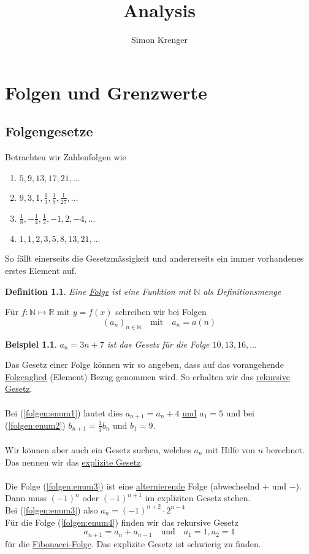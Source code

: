 \documentclass{report}
\title{Analysis}
\author{Simon Krenger}
\newtheorem{mydef}{Definition}
\newtheorem{myexample}{Beispiel}
\begin{document}
\maketitle
\chapter{Folgen und Grenzwerte}
\section{Folgengesetze}
Betrachten wir Zahlenfolgen wie
\begin{enumerate}
\item $5, 9, 13, 17, 21, ...$ \label{folgen:enum1}
\item $9, 3, 1, \frac{1}{3}, \frac{1}{9}, \frac{1}{27}, ...$ \label{folgen:enum2}
\item $\frac{1}{8}, -\frac{1}{4}, \frac{1}{2}, -1, 2, -4, ... $ \label{folgen:enum3}
\item $1, 1, 2, 3, 5, 8, 13, 21, ...$ \label{folgen:enum4}
\end{enumerate}
So fällt einerseits die Gesetzmässigkeit und andererseits ein immer vorhandenes erstes Element auf.
\begin{mydef}Eine \underline{Folge} ist eine Funktion mit $\mathbb{N}$ als Definitionsmenge\end{mydef}
Für $f: \mathbb{N} \mapsto \mathbb{R}$ mit $y = f(x)$ schreiben wir bei Folgen
\begin{equation}(a_n)_{n \in \mathbb{N}} \quad \mbox{mit} \quad a_n=a(n)\end{equation}
\begin{myexample}$a_n = 3n + 7$ ist das Gesetz für die Folge $10, 13, 16, ...$\end{myexample}
Das Gesetz einer Folge können wir so angeben, dass auf das vorangehende \underline{Folgenglied} (Element) Bezug genommen wird. So erhalten wir das \underline{rekursive Gesetz}.
\\\\
Bei (\ref{folgen:enum1}) lautet dies $a_{n+1} = a_n + 4$ \underline{und} $a_1 = 5$ und bei (\ref{folgen:enum2}) $b_{n+1}=\frac{1}{3}b_n$ und $b_1=9$.
\\\\
Wir können aber auch ein Gesetz suchen, welches $a_n$ mit Hilfe von $n$ berechnet. Das nennen wir das \underline{explizite Gesetz}.
\\\\
Die Folge (\ref{folgen:enum3}) ist eine \underline{alternierende} Folge (abwechselnd $+$ und $-$). Dann muss $(-1)^n$ oder $(-1)^{n+1}$ im expliziten Gesetz stehen.\\
Bei (\ref{folgen:enum3}) also $a_n = (-1)^{n+2} \cdot 2^{n-4}$\\
Für die Folge  (\ref{folgen:enum4}) finden wir das rekursive Gesetz
\begin{equation}a_{n+1} = a_n + a_{n-1} \quad \mbox{und} \quad a_1=1, a_2=1\end{equation}
für die \underline{Fibonacci-Folge}. Das explizite Gesetz ist schwierig zu finden.
\end{document}
